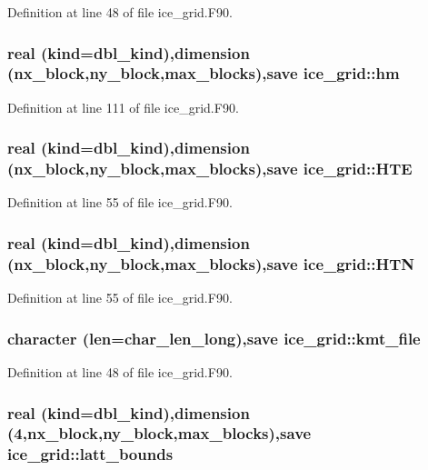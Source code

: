 Definition at line 48 of file ice\_\-grid.F90.\hypertarget{namespaceice__grid_a7ecb27b1b130ed860c56ab81f4a9373e}{
\subsubsection[{hm}]{\setlength{\rightskip}{0pt plus 5cm}real (kind=dbl\_\-kind),dimension (nx\_\-block,ny\_\-block,max\_\-blocks),save {\bf ice\_\-grid::hm}}}
\label{namespaceice__grid_a7ecb27b1b130ed860c56ab81f4a9373e}


Definition at line 111 of file ice\_\-grid.F90.\hypertarget{namespaceice__grid_a881253aa819ce18c46c4bffb3d558616}{
\subsubsection[{HTE}]{\setlength{\rightskip}{0pt plus 5cm}real (kind=dbl\_\-kind),dimension (nx\_\-block,ny\_\-block,max\_\-blocks),save {\bf ice\_\-grid::HTE}}}
\label{namespaceice__grid_a881253aa819ce18c46c4bffb3d558616}


Definition at line 55 of file ice\_\-grid.F90.\hypertarget{namespaceice__grid_a6d5e0411ab66c52d72c0bcc75f794eab}{
\subsubsection[{HTN}]{\setlength{\rightskip}{0pt plus 5cm}real (kind=dbl\_\-kind),dimension (nx\_\-block,ny\_\-block,max\_\-blocks),save {\bf ice\_\-grid::HTN}}}
\label{namespaceice__grid_a6d5e0411ab66c52d72c0bcc75f794eab}


Definition at line 55 of file ice\_\-grid.F90.\hypertarget{namespaceice__grid_a21b896a78dcb089ba19cddd8a763ec94}{
\subsubsection[{kmt\_\-file}]{\setlength{\rightskip}{0pt plus 5cm}character (len=char\_\-len\_\-long),save {\bf ice\_\-grid::kmt\_\-file}}}
\label{namespaceice__grid_a21b896a78dcb089ba19cddd8a763ec94}


Definition at line 48 of file ice\_\-grid.F90.\hypertarget{namespaceice__grid_ab343eaee175150d30612b98bf5e83faf}{
\subsubsection[{latt\_\-bounds}]{\setlength{\rightskip}{0pt plus 5cm}real (kind=dbl\_\-kind),dimension (4,nx\_\-block,ny\_\-block,max\_\-blocks),save {\bf ice\_\-grid::latt\_\-bounds}}}
\label{namespaceice__grid_ab343eaee175150d30612b98bf5e83faf}


